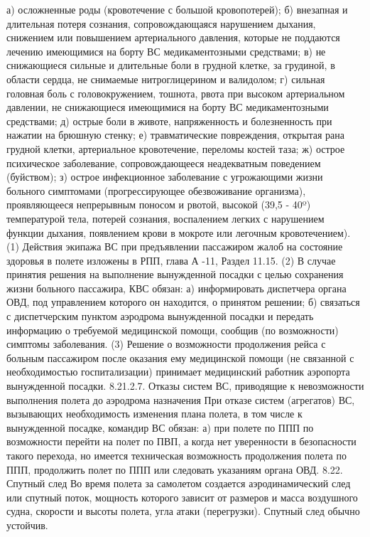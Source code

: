 а)	осложненные роды (кровотечение с большой кровопотерей);
б)	внезапная и длительная потеря сознания, сопровождающаяся нарушением дыхания, снижением или повышением артериального давления, которые не поддаются лечению имеющимися на борту ВС медикаментозными средствами;
в)	не снижающиеся сильные и длительные боли в грудной клетке, за грудиной, в области сердца, не снимаемые нитроглицерином и валидолом;
г)	сильная головная боль с головокружением, тошнота, рвота при высоком артериальном давлении, не снижающиеся имеющимися на борту ВС медикаментозными средствами;
д)	острые боли в животе, напряженность и болезненность при нажатии на брюшную стенку;
е)	травматические повреждения, открытая рана грудной клетки, артериальное кровотечение, переломы костей таза;
ж)	острое психическое заболевание, сопровождающееся неадекватным поведением (буйством);
з)	острое инфекционное заболевание с угрожающими жизни больного симптомами (прогрессирующее обезвоживание организма), проявляющееся непрерывным поносом и рвотой, высокой (39,5 - 40º) температурой тела, потерей сознания, воспалением легких с нарушением функции дыхания, появлением крови в мокроте или легочным кровотечением).
(1) Действия экипажа ВС при предъявлении пассажиром жалоб на состояние здоровья в полете изложены в РПП, глава А -11, Раздел 11.15.
(2) В случае принятия решения на выполнение вынужденной посадки с целью сохранения жизни больного пассажира, КВС обязан:
а)	информировать диспетчера органа ОВД, под управлением которого он находится, о принятом решении;
б)	связаться с диспетчерским пунктом аэродрома вынужденной посадки и передать информацию о требуемой медицинской помощи, сообщив (по возможности) симптомы заболевания.
(3) Решение о возможности продолжения рейса с больным пассажиром после оказания ему медицинской помощи (не связанной с необходимостью госпитализации) принимает медицинский работник аэропорта вынужденной посадки.
8.21.2.7.	Отказы систем ВС, приводящие к невозможности выполнения полета до аэродрома назначения
При отказе систем (агрегатов) ВС, вызывающих необходимость изменения плана полета, в том числе к вынужденной посадке, командир ВС обязан:
а)	при полете по ППП по возможности перейти на полет по ПВП, а когда нет уверенности в безопасности такого перехода, но имеется техническая возможность продолжения полета по ППП, продолжить полет по ППП или следовать указаниям органа ОВД.
8.22. Спутный след 
Во время полета за самолетом создается аэродинамический след или спутный поток, мощность которого зависит от размеров и масса воздушного судна, скорости и высоты полета, угла атаки (перегрузки). Спутный след обычно устойчив. 
